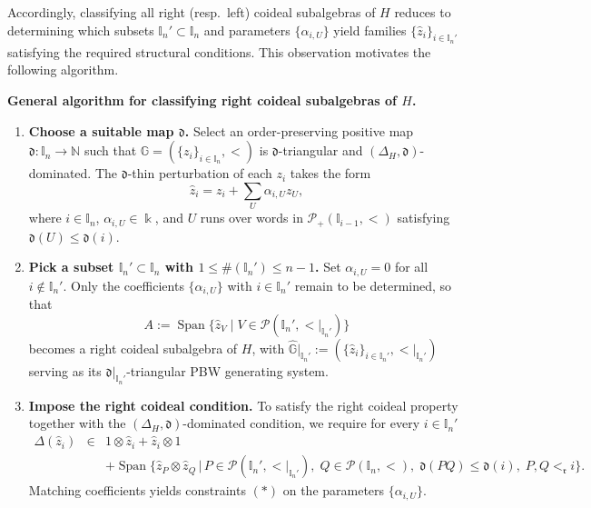 \documentclass{article}
\theoremstyle{plain}
\theoremstyle{definition}
\numberwithin{equation}{section}
\DeclareMathOperator{\Span}{Span}
\newcommand{\PP}{\mathcal{P}}
\newcommand{\GG}{\mathbb{G}}
\newcommand{\II}{\mathbb{I}}
\newcommand{\dd}{\mathfrak{d}}
\newcommand{\rr}{\mathfrak{r}}
\begin{document}
	Accordingly,  classifying all right (resp.\ left) coideal subalgebras of $H$ reduces to determining which subsets $\II_{n}'\subset\II_{n}$ and parameters $\{\alpha_{i,U}\}$ yield families $\{\hat z_{i}\}_{i\in\II_{n}'}$ satisfying the required structural conditions. This observation motivates the following algorithm.
	
	\medskip\noindent
	\textbf{General algorithm for  classifying  right coideal subalgebras of $H$.}
	\begin{enumerate}
		\item[1.] \textbf{Choose a suitable map $\dd$.}
		Select an order-preserving positive map $\dd\colon\II_{n}\longrightarrow\mathbb{N}$
		such that $\GG=(\{z_{i}\}_{i\in \II_{n}}, <)$ is $\dd$-triangular and $(\Delta_{H},\dd)$-dominated. The $\dd$-thin perturbation of each $z_{i}$ takes the form
		\[
		\hat z_{i}=z_{i}+\sum_{U}\alpha_{i,U}z_{U},
		\]
		where $i\in\II_{n}$, $\alpha_{i,U}\in\Bbbk$, and $U$ runs over words in $\PP_{+}(\II_{i-1},<)$ satisfying $\dd(U)\le \dd(i)$.
		
		\item[2.] \textbf{Pick a subset $\II_{n}'\subset \II_{n}$ with $1\leq \#(\II_{n}') \leq n-1$.}
		Set $\alpha_{i,U}=0$ for all $i\not\in \II_{n}'$. Only the coefficients $\{\alpha_{i,U}\}$ with $i\in \II_{n}'$ remain to be determined, so that
		\[
		A:=\Span\{\hat{z}_{V}\mid V\in \PP(\II_{n}', {<}|_{\II_{n}'})\}
		\]
		becomes a right coideal subalgebra of $H$, with $\hat{\GG}|_{\II_{n}'}:= (\{\hat{z}_{i}\}_{i\in \II_{n}'}, {<}|_{\II_{n}'})$ serving as its $\dd|_{\II_{n}'}$-triangular PBW generating system.
		
		\item[3.] \textbf{Impose the right coideal condition.}
		To satisfy the right coideal property together with the $(\Delta_{H},\dd)$-dominated condition, we require for every $i\in\II_{n}'$
		\begin{eqnarray*}
			\Delta(\hat z_{i}) &\in& 1\otimes\hat z_{i}+\hat z_{i}\otimes 1 \\
			&& +\Span\bigl\{\hat z_{P}\otimes\hat z_{Q}\,\big|\,
			P\in\PP(\II_{n}',{<}|_{\II_{n}'}),\; Q\in\PP(\II_{n},<),\;
			\dd(PQ)\le\dd(i),\; P, Q<_{\rr }i\bigr\}.
		\end{eqnarray*}
		Matching coefficients yields constraints $(\ast)$ on the parameters $\{\alpha_{i,U}\}$.
		

\end{enumerate}
\end{document}
